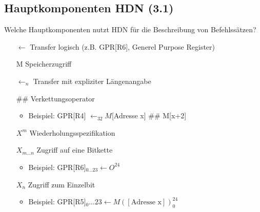 \subsection{Hauptkomponenten HDN (3.1)}
Welche Hauptkomponenten nutzt HDN für die Beschreibung von Befehlssätzen?
\begin{itemize}
	\item[$\leftarrow$] Transfer logisch (z.B. GPR[R6], Generel Purpose Register)
	\item[M] Speicherzugriff
	\item[$\leftarrow _n$] Transfer mit expliziter Längenangabe
	\item[\#\#] Verkettungsoperator
	\begin{itemize}
		\item Beispiel: GPR[R4] $\leftarrow _{32} M$[Adresse x] \#\# M[x+2]
	\end{itemize}
	\item[$X^m$] Wiederholungsspezifikation
	\item[$X_{m\ldots n}$] Zugriff auf eine Bitkette
	\begin{itemize}
		\item Beispiel: GPR[R6]$_{0\ldots 23} \leftarrow O^{24}$ 
	\end{itemize}
	\item[$X_n$] Zugriff zum Einzelbit
	\begin{itemize}
		\item Beispiel: GPR[R5]$_0\ldots 23\leftarrow M([\text{Adresse x}])_0^{24}$
	\end{itemize}
\end{itemize}
